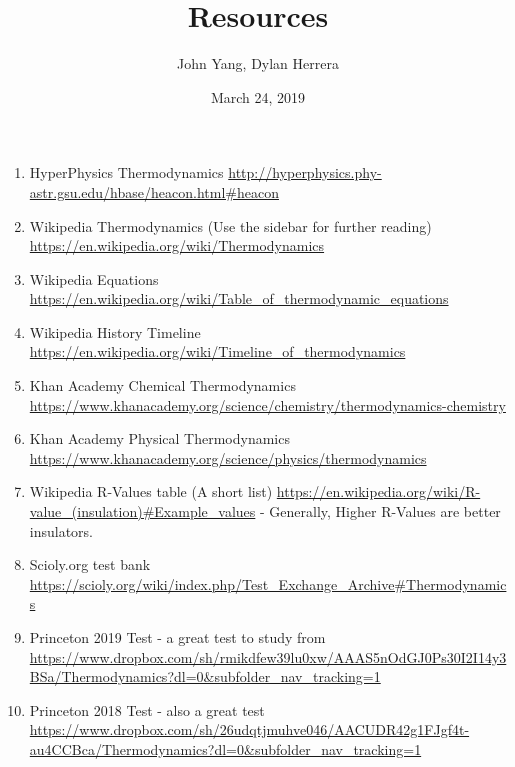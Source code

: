 \documentclass{article}
\title{Resources}
\author{John Yang, Dylan Herrera}
\date{March 24, 2019}
\begin{document}
\maketitle
\begin{enumerate}
\item HyperPhysics Thermodynamics \url{http://hyperphysics.phy-astr.gsu.edu/hbase/heacon.html\#heacon}
\item Wikipedia Thermodynamics (Use the sidebar for further reading) \url{https://en.wikipedia.org/wiki/Thermodynamics}
\item Wikipedia Equations \url{https://en.wikipedia.org/wiki/Table_of_thermodynamic_equations}
\item Wikipedia History Timeline \url{https://en.wikipedia.org/wiki/Timeline_of_thermodynamics}
\item Khan Academy Chemical Thermodynamics \url{https://www.khanacademy.org/science/chemistry/thermodynamics-chemistry}
\item Khan Academy Physical Thermodynamics \url{https://www.khanacademy.org/science/physics/thermodynamics}
\item Wikipedia R-Values table (A short list) \url{https://en.wikipedia.org/wiki/R-value_(insulation)\#Example\_values} - Generally, Higher R-Values are better insulators. 
\item Scioly.org test bank \url{https://scioly.org/wiki/index.php/Test_Exchange_Archive#Thermodynamics}
\item Princeton 2019 Test - a great test to study from \url{https://www.dropbox.com/sh/rmikdfew39lu0xw/AAAS5nOdGJ0Ps30I2I14y3BSa/Thermodynamics?dl=0&subfolder_nav_tracking=1}
\item Princeton 2018 Test - also a great test \url{https://www.dropbox.com/sh/26udqtjmuhve046/AACUDR42g1FJgf4t-au4CCBca/Thermodynamics?dl=0&subfolder_nav_tracking=1}
\end{enumerate}
\end{document}
